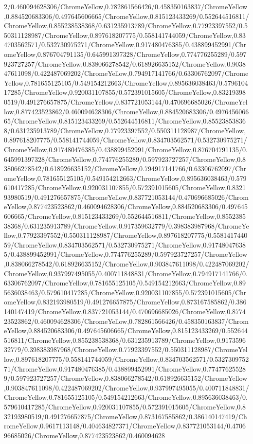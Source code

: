 {\begin{tikzternal}
{2/0.460094628306/ChromeYellow,0.782861566426/0.458350163837/ChromeYellow,0.884520683306/0.497645606665/ChromeYellow,0.815123433269/0.552644516811/ChromeYellow,0.855238538368/0.631235913789/ChromeYellow,0.77923397552/0.550311128987/ChromeYellow,0.897618207775/0.558141744059/ChromeYellow,0.834703562571/0.532730975271/ChromeYellow,0.917480476385/0.438899452991/ChromeYellow,0.876704791135/0.645991397328/ChromeYellow,0.774776255289/0.597923727257/ChromeYellow,0.838066278542/0.618926635152/ChromeYellow,0.903847611098/0.422487069202/ChromeYellow,0.794917141766/0.63306762097/ChromeYellow,0.781655125105/0.549154212663/ChromeYellow,0.895636038463/0.579610417285/ChromeYellow,0.920031107855/0.572391015605/ChromeYellow,0.832193980519/0.491276657875/ChromeYellow,0.837721053144/0.470696685026/ChromeYellow,0.877423523862/0.460094628306/ChromeYellow,0.884520683306/0.497645606665/ChromeYellow,0.815123433269/0.552644516811/ChromeYellow,0.855238538368/0.631235913789/ChromeYellow,0.77923397552/0.550311128987/ChromeYellow,0.897618207775/0.558141744059/ChromeYellow,0.834703562571/0.532730975271/ChromeYellow,0.917480476385/0.438899452991/ChromeYellow,0.876704791135/0.645991397328/ChromeYellow,0.774776255289/0.597923727257/ChromeYellow,0.838066278542/0.618926635152/ChromeYellow,0.794917141766/0.63306762097/ChromeYellow,0.781655125105/0.549154212663/ChromeYellow,0.895636038463/0.579610417285/ChromeYellow,0.920031107855/0.572391015605/ChromeYellow,0.832193980519/0.491276657875/ChromeYellow,0.837721053144/0.470696685026/ChromeYellow,0.877423523862/0.460094628306/ChromeYellow,0.884520683306/0.497645606665/ChromeYellow,0.815123433269/0.552644516811/ChromeYellow,0.855238538368/0.631235913789/ChromeYellow,0.917359632779/0.398383987968/ChromeYellow,0.77923397552/0.550311128987/ChromeYellow,0.897618207775/0.558141744059/ChromeYellow,0.834703562571/0.532730975271/ChromeYellow,0.917480476385/0.438899452991/ChromeYellow,0.774776255289/0.597923727257/ChromeYellow,0.838066278542/0.618926635152/ChromeYellow,0.903847611098/0.422487069202/ChromeYellow,0.937997495055/0.400711848831/ChromeYellow,0.794917141766/0.63306762097/ChromeYellow,0.781655125105/0.549154212663/ChromeYellow,0.895636038463/0.579610417285/ChromeYellow,0.920031107855/0.572391015605/ChromeYellow,0.832193980519/0.491276657875/ChromeYellow,0.873167585862/0.386140147419/ChromeYellow,0.837721053144/0.470696685026/ChromeYellow,0.877423523862/0.460094628306/ChromeYellow,0.782861566426/0.458350163837/ChromeYellow,0.884520683306/0.497645606665/ChromeYellow,0.815123433269/0.552644516811/ChromeYellow,0.855238538368/0.631235913789/ChromeYellow,0.917359632779/0.398383987968/ChromeYellow,0.77923397552/0.550311128987/ChromeYellow,0.897618207775/0.558141744059/ChromeYellow,0.834703562571/0.532730975271/ChromeYellow,0.917480476385/0.438899452991/ChromeYellow,0.774776255289/0.597923727257/ChromeYellow,0.838066278542/0.618926635152/ChromeYellow,0.903847611098/0.422487069202/ChromeYellow,0.937997495055/0.400711848831/ChromeYellow,0.781655125105/0.549154212663/ChromeYellow,0.895636038463/0.579610417285/ChromeYellow,0.920031107855/0.572391015605/ChromeYellow,0.832193980519/0.491276657875/ChromeYellow,0.873167585862/0.386140147419/ChromeYellow,0.9617113148/0.404634827371/ChromeYellow,0.837721053144/0.470696685026/ChromeYellow,0.877423523862/0.460094628}
\end{tikzternal}}
